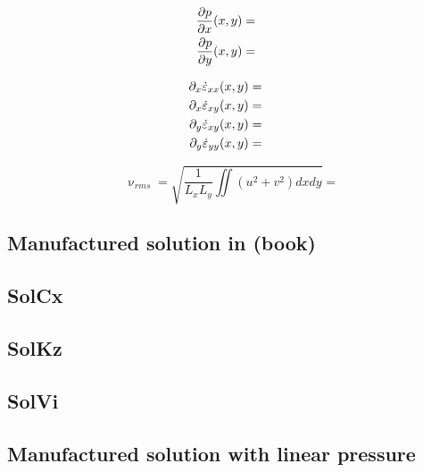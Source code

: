 \begin{eqnarray}
\frac{\partial p}{\partial x} (x,y)&=& \nonumber\\
\frac{\partial p}{\partial y} (x,y)&=& \nonumber
\end{eqnarray}

\begin{eqnarray}
\partial_x \dot\varepsilon_{xx} (x,y)&=& \nonumber\\
\partial_x \dot\varepsilon_{xy} (x,y)&=& \nonumber\\
\partial_y \dot\varepsilon_{xy} (x,y)&=& \nonumber\\
\partial_y \dot\varepsilon_{yy} (x,y)&=& \nonumber
\end{eqnarray}

\[
\upnu_{rms}=\sqrt{ \frac{1}{L_xL_y} \iint (u^2+v^2) dxdy   } = 
\]

\subsection{Manufactured solution in \textcite{dohu03} (book) \label{mms1}}


\subsection{SolCx}\label{ss:solcx} 


\subsection{SolKz} \label{ss:solkz} 


\subsection{SolVi} \label{ss:solvi} 


\subsection{Manufactured solution with linear pressure \label{mms_plin}}


